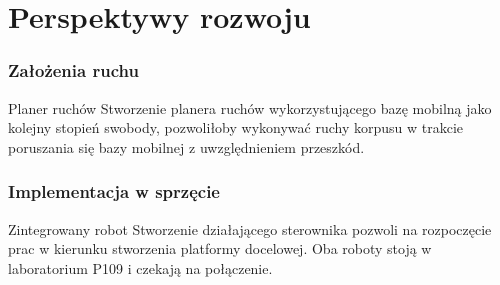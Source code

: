 \section{Perspektywy rozwoju}


\begin{frame}
    \frametitle{Założenia ruchu}
    \begin{block}{Planer ruchów}
    Stworzenie planera ruchów wykorzystującego bazę mobilną jako kolejny stopień swobody,
    pozwoliłoby wykonywać ruchy korpusu w trakcie poruszania się bazy mobilnej z uwzględnieniem 
    przeszkód.
    \end{block}
\end{frame}


\begin{frame}
    \frametitle{Implementacja w sprzęcie}
    \begin{block}{Zintegrowany robot}
    Stworzenie działającego sterownika pozwoli na rozpoczęcie prac w kierunku stworzenia platformy docelowej.
    Oba roboty stoją w laboratorium P109 i czekają na połączenie.
    \end{block}
\end{frame}